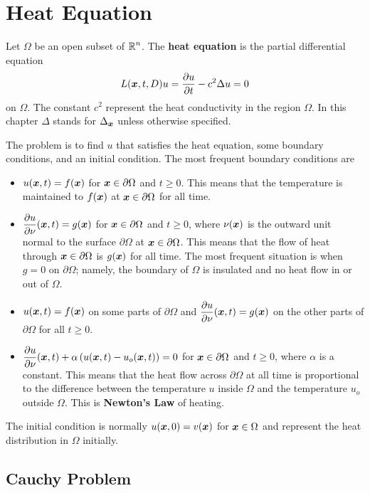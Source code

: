 \chapter{Heat Equation} \label{ChapHeatEqu}

Let $\Omega$ be an open subset of $\displaystyle \mathbb{R}^n$.  The
{\bfseries heat equation}
is the partial differential equation
\[
L({\bm{x}},t,D) u = \frac{\partial{u}}{\partial t} - c^2 \Delta u = 0
\]
on $\Omega$.  The constant $\displaystyle c^2$ represent the heat
conductivity in the region $\Omega$.  In this chapter $\Delta$ stands for
$\Delta_{{\bm{x}}}$ unless otherwise specified.

The problem is to find $u$ that satisfies the heat equation, some
boundary conditions, and an initial condition.  The most frequent
boundary conditions are
\begin{itemize}
\item $u({\bm{x}},t)=f({\bm{x}})$ for ${\bm{x}} \in \partial \Omega$ and
$t\geq 0$.  This means that the temperature is maintained to
$f({\bm{x}})$ at ${\bm{x}} \in \partial \Omega$ for all time.
\item $\displaystyle \frac{\partial{u}}{\partial \nu}({\bm{x}},t) = g({\bm{x}})$ for
${\bm{x}} \in \partial \Omega$ and $t\geq 0$, where $\nu({\bm{x}})$
is the outward unit normal to the surface $\partial \Omega$ at
${\bm{x}}\in \partial \Omega$.  This means that the flow of heat
through ${\bm{x}} \in \partial \Omega$ is $g({\bm{x}})$ for all time.
The most frequent situation is when $g=0$ on $\partial \Omega$;
namely, the boundary of $\Omega$ is insulated and no heat flow in or
out of $\Omega$.
\item $u({\bm{x}},t)=f({\bm{x}})$ on some parts of $\partial \Omega$ and
$\displaystyle \frac{\partial{u}}{\partial \nu}({\bm{x}},t) = g({\bm{x}})$ on the
other parts of $\partial \Omega$ for all $t\geq 0$.
\item $\displaystyle \frac{\partial{u}}{\partial \nu}({\bm{x}},t) + \alpha \left(
u({\bm{x}},t) - u_o({\bm{x}},t)\right) = 0$ for
${\bm{x}} \in \partial \Omega$ and $t\geq 0$,
where $\alpha$ is a constant.  This means that the heat flow
across $\partial \Omega$ at all time is proportional to the difference
between the temperature $u$ inside $\Omega$ and the temperature $u_o$
outside $\Omega$.  This is
{\bfseries Newton's Law} of heating.
\end{itemize}
The initial condition is normally $u({\bm{x}},0) = v({\bm{x}})$ for
${\bm{x}} \in \Omega$ and represent the heat distribution in $\Omega$
initially.

\section{Cauchy Problem}  \label{SectHeatEqCauchyPr}

